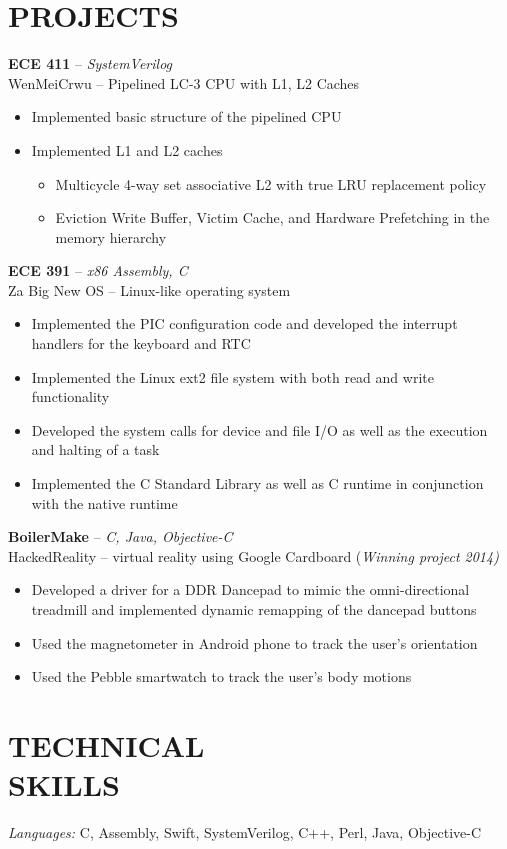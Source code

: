 \documentclass[resmargin]{res}
\begin{document}
\begin{resume}
\section{PROJECTS} 
{\bf ECE 411} -- {\sl SystemVerilog} \\
\textnormal {WenMeiCrwu -- Pipelined LC-3 CPU with L1, L2 Caches} 
\begin{itemize} \itemsep -2pt
\vspace {.5mm}
\item Implemented basic structure of the pipelined CPU
\item Implemented L1 and L2 caches 
	\begin{itemize} \itemsep -2pt
	\vspace{-2mm}
	\item Multicycle 4-way set associative L2 with true LRU replacement policy
	\vspace{0.5mm}
	\item Eviction Write Buffer, Victim Cache, and Hardware Prefetching in the memory hierarchy
	\vspace{-1.5mm}
	\end{itemize}
\end{itemize}
\vspace{-4mm}
{\bf ECE 391} -- {\sl x86 Assembly, C} \\ 
\textnormal {Za Big New OS -- Linux-like operating system} 
\begin{itemize} \itemsep -2pt
\vspace {.5mm}
\item Implemented the PIC configuration code and developed the interrupt handlers for the keyboard and RTC
\item Implemented the Linux ext2 file system with both read and write functionality
\item Developed the system calls for device and file I/O as well as the execution and halting of a task
\item Implemented the C Standard Library as well as C runtime in conjunction with the native runtime 
\end{itemize}
\vspace{-3mm}
{\bf BoilerMake} -- {\sl C, Java, Objective-C} \\
\textnormal {HackedReality -- virtual reality using Google Cardboard} (\sl {Winning project 2014})
\begin{itemize} \itemsep -2pt
\item Developed a driver for a DDR Dancepad to mimic the omni-directional treadmill and implemented dynamic remapping of the dancepad buttons
\item Used the magnetometer in Android phone to track the user's orientation
\item Used the Pebble smartwatch to track the user's body motions
\end{itemize}
\vspace{-3mm}

\section{TECHNICAL \\ SKILLS} {\sl Languages:} C, Assembly, Swift, SystemVerilog, C++, Perl, Java, Objective-C

\end{resume}
\end{document}

